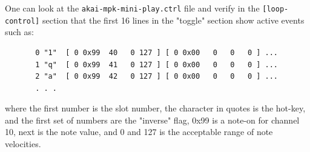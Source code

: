 \documentclass[
 11pt,
 twoside,
 a4paper,
 final                                 %
]{article}
\begin{document}
   One can look at the \texttt{akai-mpk-mini-play.ctrl} file
   and verify in the \texttt{[loop-control]} section that the
   first 16 lines in the "toggle" section show active events
   such as:

   \begin{verbatim}
       0 "1"  [ 0 0x99  40   0 127 ] [ 0 0x00   0   0   0 ] ...
       1 "q"  [ 0 0x99  41   0 127 ] [ 0 0x00   0   0   0 ] ...
       2 "a"  [ 0 0x99  42   0 127 ] [ 0 0x00   0   0   0 ] ...
       . . .
   \end{verbatim}

   where the first number is the slot number,
   the character in quotes is the hot-key, and the first set of
   numbers are the "inverse" flag, 0x99 is a note-on for channel
   10, next is the note value, and 0 and 127 is the acceptable
   range of note velocities.

\end{document}
